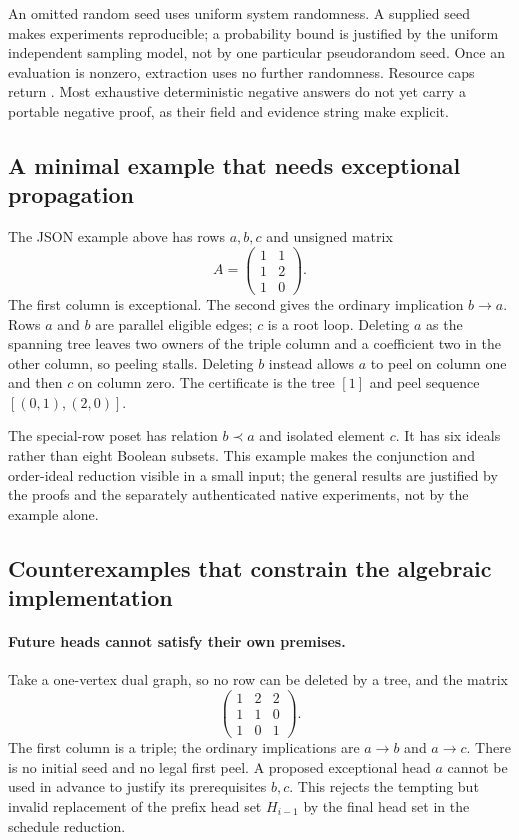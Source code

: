 An omitted random seed uses uniform system randomness.  A supplied seed
makes experiments reproducible; a probability bound is justified by the
uniform independent sampling model, not by one particular pseudorandom
seed.  Once an evaluation is nonzero, extraction uses no further randomness.
Resource caps return .  Most exhaustive deterministic
negative answers do not yet carry a portable negative proof, as their
 field and evidence string make explicit.

\subsection{A minimal example that needs exceptional propagation}

The JSON example above has rows $a,b,c$ and unsigned matrix
\[
        A=\begin{pmatrix}1&1\\1&2\\1&0\end{pmatrix}.
\]
The first column is exceptional.  The second gives the ordinary implication
$b\to a$.  Rows $a$ and $b$ are parallel eligible edges; $c$ is a root loop.
Deleting $a$ as the spanning tree leaves two owners of the triple column
and a coefficient two in the other column, so peeling stalls.  Deleting
$b$ instead allows $a$ to peel on column one and then $c$ on column zero.
The certificate is the tree \([1]\) and peel sequence \([(0,1),(2,0)]\).

The special-row poset has relation $b\prec a$ and isolated element $c$.
It has six ideals rather than eight Boolean subsets.  This example makes
the conjunction and order-ideal reduction visible in a small input; the
general results are justified by the proofs and the separately authenticated
native experiments, not by the example alone.

\subsection{Counterexamples that constrain the algebraic implementation}

\paragraph{Future heads cannot satisfy their own premises.}
Take a one-vertex dual graph, so no row can be deleted by a tree, and the
matrix
\[
        \begin{pmatrix}1&2&2\\1&1&0\\1&0&1\end{pmatrix}.
\]
The first column is a triple; the ordinary implications are $a\to b$ and
$a\to c$.  There is no initial seed and no legal first peel.  A proposed
exceptional head $a$ cannot be used in advance to justify its prerequisites
$b,c$.  This rejects the tempting but invalid replacement of the prefix
head set $H_{i-1}$ by the final head set in the schedule reduction.

